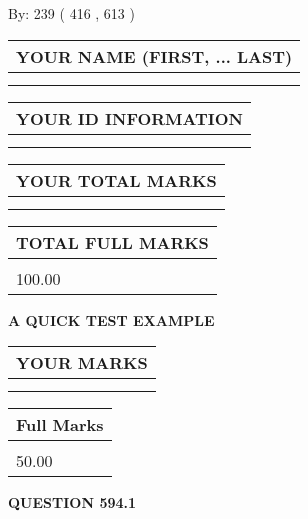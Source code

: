\documentclass[12pt]{article}
\begin{document}
   
\hspace{1.0in} By: 
 239 ( 416 ,  613 )
   
   
   
   
\newpage 
\setcounter{page}{ 
   594001 } 
   
   
   
   
\noindent\begin{tabular}{|l|}
\hline
YOUR NAME (FIRST, ... LAST)  \\
\hline
 \\ 
 \\ 
\hline
\end{tabular}
\hspace{0.05in} \begin{tabular}{|l|}
\hline
 YOUR   ID   INFORMATION  \\
\hline
 \\ 
 \\ 
\hline
\end{tabular}
   
   
\vspace{0.2in}\noindent\begin{tabular}{|l|}
\hline
YOUR TOTAL MARKS  \\
\hline
 \\ 
 \\ 
\hline
\end{tabular}
\hspace{0.05in} \begin{tabular}{|l|}
\hline
TOTAL FULL MARKS  \\
\hline
 \\ 
100.00 \\
\hline
\end{tabular}
   
   
 \vspace{0.2in}
{\LARGE {\textbf{ A QUICK TEST EXAMPLE}}}
   
   
  
\vspace{0.2in}
  
\noindent\begin{tabular}{|l|}
\hline
 YOUR MARKS  \\
\hline
 \\ 
 \\ 
\hline
\end{tabular}
\hspace{0.05in} \begin{tabular}{|l|}
\hline
 Full Marks  \\
\hline
 \\ 
50.00 \\
\hline
\end{tabular}
{\textbf{\Large{QUESTION
594.1 
}}}
  
\end{document}
